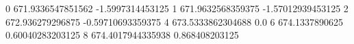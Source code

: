 0 671.9336547851562 -1.5997314453125
1 671.9632568359375 -1.57012939453125
2 672.936279296875 -0.59710693359375
4 673.5333862304688 0.0
6 674.1337890625 0.60040283203125
8 674.4017944335938 0.868408203125
